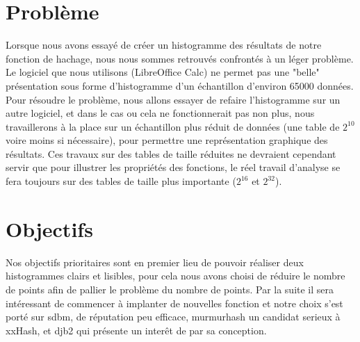 \documentclass[final,twoside,article,10pt]{scrartcl}
\begin{document}
\section{Problème}
    Lorsque nous avons essayé de créer un histogramme des résultats de notre fonction de hachage, nous nous sommes retrouvés confrontés à un léger problème.
    Le logiciel que nous utilisons (LibreOffice Calc) ne permet pas une "belle" présentation sous forme d'histogramme d'un échantillon d'environ 65000 données.
    Pour résoudre le problème, nous allons essayer de refaire l'histogramme sur un autre logiciel, et dans le cas ou cela ne fonctionnerait pas non plus, nous travaillerons à la place sur un échantillon plus réduit de données (une table de $2^{10}$ voire moins si nécessaire), pour permettre une représentation graphique des résultats.
    Ces travaux sur des tables de taille réduites ne devraient cependant servir que pour illustrer les propriétés des fonctions, le réel travail d'analyse se fera toujours sur des tables de taille plus importante ($2^{16}$ et $2^{32}$).
    \par 

\section*{Objectifs}

Nos objectifs prioritaires sont en premier lieu de pouvoir réaliser deux histogrammes clairs et lisibles, pour cela nous avons choisi de réduire le nombre de points afin de pallier le problème du nombre de points. Par la suite il sera intéressant de commencer à implanter de nouvelles fonction et notre choix s'est porté sur sdbm, de réputation peu efficace, murmurhash un candidat serieux à xxHash, et djb2 qui présente un interêt de par sa conception.


\end{document}
